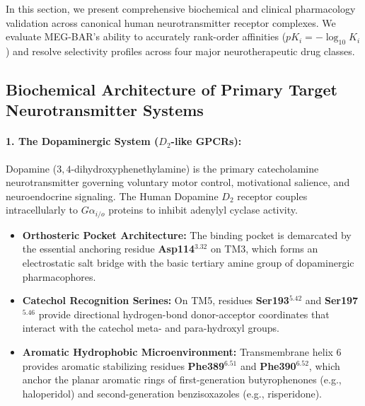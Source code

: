 \documentclass{article}
\theoremstyle{definition}
\begin{document}
In this section, we present comprehensive biochemical and clinical pharmacology validation across canonical human neurotransmitter receptor complexes. We evaluate MEG-BAR's ability to accurately rank-order affinities ($pK_i = -\log_{10} K_i$) and resolve selectivity profiles across four major neurotherapeutic drug classes.

\subsection{Biochemical Architecture of Primary Target Neurotransmitter Systems}

\paragraph{1. The Dopaminergic System ($D_2$-like GPCRs):}
Dopamine ($3,4$-dihydroxyphenethylamine) is the primary catecholamine neurotransmitter governing voluntary motor control, motivational salience, and neuroendocrine signaling. The Human Dopamine $D_2$ receptor couples intracellularly to $G\alpha_{i/o}$ proteins to inhibit adenylyl cyclase activity. 
\begin{itemize}[leftmargin=1.5em,noitemsep]
    \item \textbf{Orthosteric Pocket Architecture:} The binding pocket is demarcated by the essential anchoring residue \textbf{Asp114$^{3.32}$} on TM3, which forms an electrostatic salt bridge with the basic tertiary amine group of dopaminergic pharmacophores.
    \item \textbf{Catechol Recognition Serines:} On TM5, residues \textbf{Ser193$^{5.42}$} and \textbf{Ser197$^{5.46}$} provide directional hydrogen-bond donor-acceptor coordinates that interact with the catechol meta- and para-hydroxyl groups.
    \item \textbf{Aromatic Hydrophobic Microenvironment:} Transmembrane helix 6 provides aromatic stabilizing residues \textbf{Phe389$^{6.51}$} and \textbf{Phe390$^{6.52}$}, which anchor the planar aromatic rings of first-generation butyrophenones (e.g., haloperidol) and second-generation benzisoxazoles (e.g., risperidone).
\end{itemize}
\end{document}
